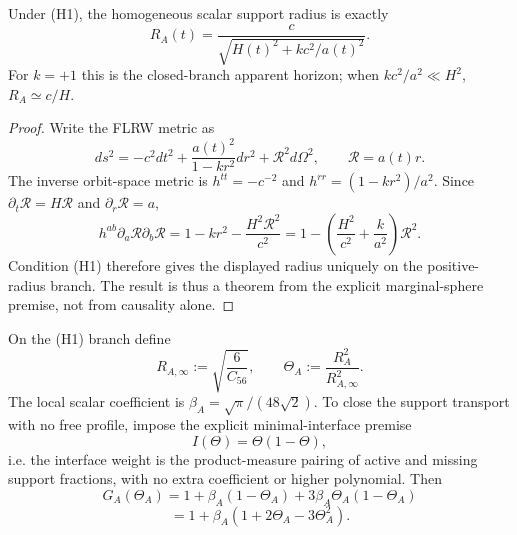 \documentclass[12pt,a4paper]{article}
\begin{document}
\begin{proposition}
\label{p8:prop:causal-flrw-support-selector}
Under (H1), the homogeneous scalar support radius is exactly
\begin{equation}
\label{p8:eq:hs-apparent-horizon-radius}
R_A(t)=\frac{c}{\sqrt{H(t)^2+k c^2/a(t)^2}}.
\end{equation}
For $k=+1$ this is the closed-branch apparent horizon; when $kc^2/a^2\ll H^2$, $R_A\simeq c/H$.
\end{proposition}

\begin{proof}
Write the FLRW metric as
\[
ds^2=-c^2dt^2+\frac{a(t)^2}{1-kr^2}dr^2+\mathcal R^2d\Omega^2,
\qquad \mathcal R=a(t)r.
\]
The inverse orbit-space metric is $h^{tt}=-c^{-2}$ and $h^{rr}=(1-kr^2)/a^2$.  Since $\partial_t\mathcal R=H\mathcal R$ and $\partial_r\mathcal R=a$,
\[
h^{ab}\partial_a\mathcal R\partial_b\mathcal R
=1-kr^2-\frac{H^2\mathcal R^2}{c^2}
=1-\left(\frac{H^2}{c^2}+\frac{k}{a^2}\right)\mathcal R^2.
\]
Condition (H1) therefore gives the displayed radius uniquely on the positive-radius branch.  The result is thus a theorem from the explicit marginal-sphere premise, not from causality alone.
\end{proof}



\begin{proposition}
\label{p8:prop:horizon-transport-scalar-trace-kernel}
On the (H1) branch define
\begin{equation}
\label{p8:eq:hs-RA-infty-pre}
R_{A,\infty}:=\sqrt{\frac{6}{C_{56}}},
\qquad
\Theta_A:=\frac{R_A^2}{R_{A,\infty}^2}.
\end{equation}
The local scalar coefficient is $\beta_A=\sqrt\pi/(48\sqrt2)$.  To close the support transport with no free profile, impose the explicit minimal-interface premise
\begin{equation}
\label{p8:eq:H2-minimal-interface}
\tag{H2}
I(\Theta)=\Theta(1-\Theta),
\end{equation}
i.e. the interface weight is the product-measure pairing of active and missing support fractions, with no extra coefficient or higher polynomial.  Then
\begin{equation}
\label{p8:eq:hs-GA-transport-prop}
G_A(\Theta_A)=1+\beta_A(1-\Theta_A)+3\beta_A\Theta_A(1-\Theta_A)
\end{equation}
\begin{equation}
\label{p8:eq:hs-GA-transport-prop-simplified}
=1+\beta_A(1+2\Theta_A-3\Theta_A^2).
\end{equation}
\end{proposition}
\end{document}
